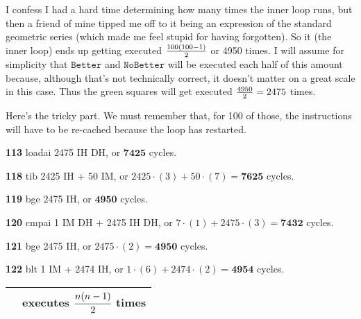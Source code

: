 \documentclass[a4paper]{article}
\begin{document}
I confess I had a hard time determining how many times the inner loop runs, but then a friend of mine tipped me off to it being an expression of the standard geometric series (which made me feel stupid for having forgotten). So it (the inner loop) ends up getting executed ${100(100-1) \over 2}$ or 4950 times. I will assume for simplicity that $\texttt{Better}$ and $\texttt{NoBetter}$ will be executed each half of this amount because, although that's not technically correct, it doesn't matter on a great scale in this case. Thus the green squares will get executed ${4950 \over 2} = 2475$ times.

Here's the tricky part. We must remember that, for 100 of those, the instructions will have to be re-cached because the loop has restarted.

\textbf{113} loadai 2475 IH DH, or $\mathbf{7425}$ cycles.

\textbf{118} tib 2425 IH + 50 IM, or $2425 \cdot (3) + 50 \cdot (7) = \mathbf{7625}$ cycles.

\textbf{119} bge 2475 IH, or $\mathbf{4950}$ cycles.

\textbf{120} cmpai 1 IM DH + 2475 IH DH, or $7 \cdot (1) + 2475 \cdot (3) = \mathbf{7432}$ cycles.

\textbf{121} bge 2475 IH, or $2475 \cdot (2) = \mathbf{4950}$ cycles.

\textbf{122} blt 1 IM + 2474 IH, or $1 \cdot (6) + 2474 \cdot (2) = \mathbf{4954}$ cycles. \\

\begin{tabular}{|c|c|}
\hline
\cellcolor{yellow} & executes $\cfrac{n(n-1)}{2}$ times \\
\hline
\end{tabular}
\end{document}
